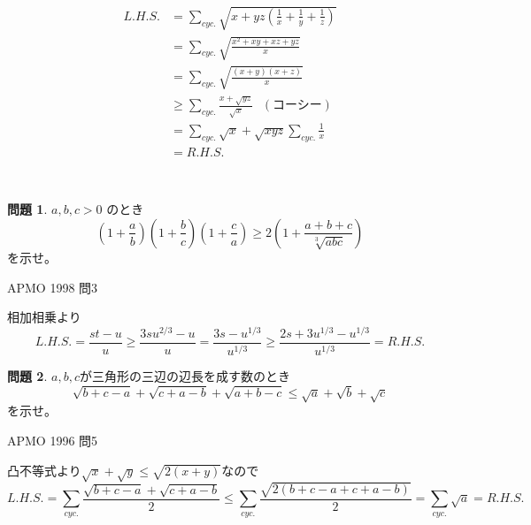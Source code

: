 \documentclass[uplatex, a5paper]{jsarticle}
\makeatletter
\theoremstyle{definition}
\newtheorem{prob}{問題}
\renewenvironment{proof}[1][\proofname]{
  \pushQED{\qed}%
  \normalfont \topsep6\p@\@plus6\p@\relax
  \trivlist
  \item[\hskip\labelsep
    #1\@addpunct{\textbf{.}}]\ignorespaces
}{%
  \popQED\endtrivlist\@endpefalse
}
\providecommand{\proofname}{証明}
\newcommand{\lhs }{ L.H.S. }
\newcommand{\rhs }{ R.H.S. }
\def\qed{\hfill $\Box$}
\makeatother
\begin{document}
\begin{proof}
  \begin{align*}
    \lhs &= \sum_{cyc.} \sqrt{x+yz\left( \frac{1}{x} + \frac{1}{y} + \frac{1}{z} \right) } \\
    &= \sum_{cyc.} \sqrt{\frac{x^2+xy+xz+yz}{x}} \\
    &= \sum_{cyc.} \sqrt{\frac{(x+y)(x+z)}{x}} \\
    &\geq \sum_{cyc.} \frac{x+\sqrt{yz}}{\sqrt{x}} \ \ \ ( \mbox{コーシー} )\\
    &= \sum_{cyc.} \sqrt{x} + \sqrt{xyz}\sum_{cyc.}\frac{1}{x} \\
    &= \rhs
  \end{align*}
\end{proof}



\





\newpage

\begin{prob}
  \(a,b,c>0\)
  のとき
  \[
  \left( 1+\frac{a}{b}\right) \left( 1+\frac{b}{c} \right) \left( 1+\frac{c}{a}\right)
  \geq 2\left( 1+\frac{a+b+c}{\sqrt[3]{abc} } \right)
  \]
  を示せ。
  \begin{flushright}
    APMO 1998 問3
  \end{flushright}
\end{prob}


\begin{proof}
  相加相乗より
  \[
  \lhs = \frac{st-u}{u}
  \geq \frac{3su^{2/3}-u}{u} = \frac{3s-u^{1/3}}{u^{1/3}}
  \geq \frac{2s+3u^{1/3}-u^{1/3}}{u^{1/3}} = \rhs
  \]
\end{proof}










\newpage

\begin{prob}
  \(a,b,c\)が三角形の三辺の辺長を成す数のとき
  \[
  \sqrt{b+c-a} + \sqrt{c+a-b} + \sqrt{a+b-c} \leq \sqrt{a} + \sqrt{b} + \sqrt{c}
  \]
  を示せ。
  \begin{flushright}
    APMO 1996 問5
  \end{flushright}
\end{prob}


\begin{proof}
  凸不等式より\(\sqrt{x}+\sqrt{y} \leq \sqrt{ 2(x+y) }\)なので
  \[
  \lhs = \sum_{cyc.} \frac{\sqrt{b+c-a} + \sqrt{c+a-b}}{2}
  \leq \sum_{cyc.} \frac{\sqrt{2(b+c-a+c+a-b)}}{2} = \sum_{cyc.} \sqrt{a} = \rhs
  \]
\end{proof}
\end{document}
